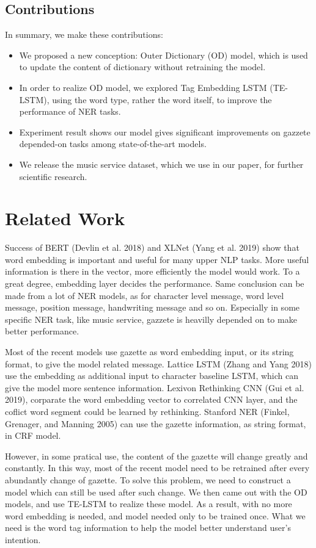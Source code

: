 \documentclass[letterpaper]{article} %
\begin{document}
\subsection{Contributions}

In summary, we make these contributions:

\begin{itemize}
\item We proposed a new conception: Outer Dictionary (OD) model, which is used to update the content of dictionary without retraining the model.
\item In order to realize OD model, we explored Tag Embedding LSTM (TE-LSTM), using the word type, rather the word itself, to improve the performance of NER tasks.
\item Experiment result shows our model gives significant improvements on gazzete depended-on tasks among state-of-the-art models.
\item We release the music service dataset, which we use in our paper, for further scientific research.
\end{itemize}

\section{Related Work}
Success of BERT (Devlin et al. 2018) and XLNet (Yang et al. 2019) show that word embedding is important and useful for many upper NLP tasks. More useful information is there in the vector, more efficiently the model would work. To a great degree, embedding layer decides the performance. Same conclusion can be made from a lot of NER models, as for character level message, word level message, position message, handwriting message and so on. Especially in some specific NER task, like music service, gazzete is heavilly depended on to make better performance. 

Most of the recent models use gazette as word embedding input, or its string format, to give the model related message. Lattice LSTM (Zhang and Yang 2018) use the embedding as additional input to character baseline LSTM, which can give the model more sentence information. Lexivon Rethinking CNN (Gui et al. 2019), corparate the word embedding vector to correlated CNN layer, and the coflict word segment could be learned by rethinking. Stanford NER (Finkel, Grenager, and Manning 2005) can use the gazette information, as string format, in CRF model.

However, in some pratical use, the content of the gazette will change greatly and constantly. In this way, most of the recent model need to be retrained after every abundantly change of gazette. To solve this problem, we need to construct a model which can still be used after such change. We then came out with the OD models, and use TE-LSTM to realize these model. As a result, with no more word embedding is needed, and model needed only to be trained once.  What we need is the word tag information to help the model better understand user's intention.
\end{document}
